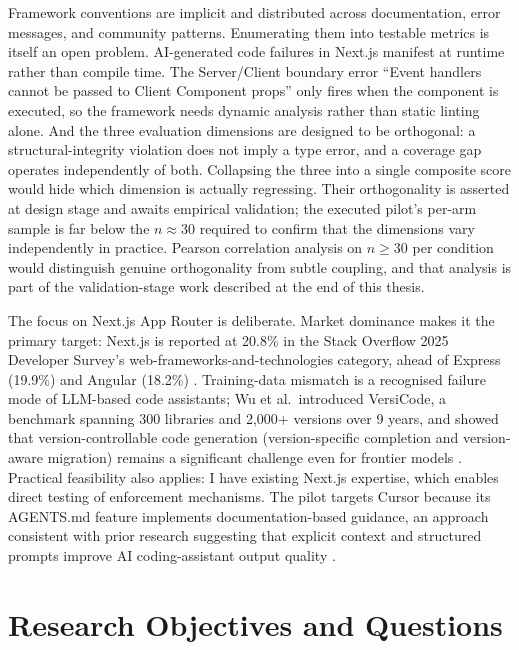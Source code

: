 \documentclass[12pt,a4paper]{report}
\begin{document}
Framework conventions are implicit and distributed across documentation, error messages, and community patterns. Enumerating them into testable metrics is itself an open problem. AI-generated code failures in Next.js manifest at runtime rather than compile time. The Server/Client boundary error ``Event handlers cannot be passed to Client Component props'' only fires when the component is executed, so the framework needs dynamic analysis rather than static linting alone. And the three evaluation dimensions are designed to be orthogonal: a structural-integrity violation does not imply a type error, and a coverage gap operates independently of both. Collapsing the three into a single composite score would hide which dimension is actually regressing. Their orthogonality is asserted at design stage and awaits empirical validation; the executed pilot's per-arm sample is far below the $n \approx 30$ required to confirm that the dimensions vary independently in practice. Pearson correlation analysis on $n \geq 30$ per condition would distinguish genuine orthogonality from subtle coupling, and that analysis is part of the validation-stage work described at the end of this thesis.

The focus on Next.js App Router is deliberate. Market dominance makes it the primary target: Next.js is reported at 20.8\% in the Stack Overflow 2025 Developer Survey's web-frameworks-and-technologies category, ahead of Express (19.9\%) and Angular (18.2\%) \parencite[1, Stack Overflow Developer Survey]{stackoverflow2025}. Training-data mismatch is a recognised failure mode of LLM-based code assistants; Wu et al.\ introduced VersiCode, a benchmark spanning 300 libraries and 2{,}000+ versions over 9 years, and showed that version-controllable code generation (version-specific completion and version-aware migration) remains a significant challenge even for frontier models \parencite{versicode2024}. Practical feasibility also applies: I have existing Next.js expertise, which enables direct testing of enforcement mechanisms. The pilot targets Cursor because its AGENTS.md feature implements documentation-based guidance, an approach consistent with prior research suggesting that explicit context and structured prompts improve AI coding-assistant output quality \parencite{barke2022grounded,zhang2023practices}.

\section{Research Objectives and Questions}
\label{sec:research-objectives}
\end{document}
